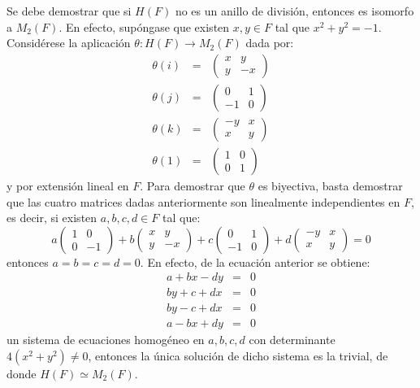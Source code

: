 \begin{proof*}
Se debe demostrar que si $H(F)$ no es un anillo de división, entonces es isomorfo a $M_2(F)$. En efecto, supóngase que existen $x,y \in F$ tal que $x^2 + y^2 = -1$. Considérese la aplicación $\theta \colon H(F) \to M_2(F)$ dada por:
\begin{eqnarray*}
\theta(i) &=& \begin{pmatrix}
x & y\\
y & -x
\end{pmatrix}\\
\theta(j) &=& \begin{pmatrix}
0 & 1\\
-1 & 0
\end{pmatrix}\\
\theta(k) &=& \begin{pmatrix}
-y & x \\
x & y 
\end{pmatrix} \\
\theta(1) &=& \begin{pmatrix}
1 & 0 \\
0 & 1
\end{pmatrix}
\end{eqnarray*}
y por extensión lineal en $F$.
Para demostrar que $\theta$ es biyectiva, basta demostrar que las cuatro matrices dadas anteriormente son linealmente independientes en $F$, es decir, si existen $a, b, c, d \in F$ tal que: 
\begin{equation*}
a\begin{pmatrix}
1 & 0\\
0 & -1
\end{pmatrix} + b\begin{pmatrix}
x & y \\
y & -x
\end{pmatrix} + c\begin{pmatrix}
0 & 1 \\
-1 & 0
\end{pmatrix} + d\begin{pmatrix}
-y & x\\
x & y
\end{pmatrix} = 0
\end{equation*}
entonces $a = b = c = d = 0$. En efecto, de la ecuación anterior se obtiene:
\begin{eqnarray*}
a + bx - dy &=& 0\\
by + c + dx &=& 0 \\
by -c + dx &=& 0 \\
a -bx + dy &=& 0
\end{eqnarray*}
un sistema de ecuaciones homogéneo en $a, b, c,d$ con determinante $4(x^2 + y^2) \neq 0$, entonces la única solución de dicho sistema es la trivial, de donde $H(F) \simeq M_2(F)$.
\end{proof*}

